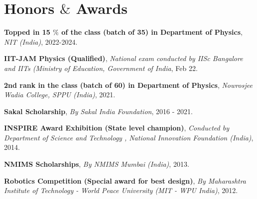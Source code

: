 \section{Honors $\&$ Awards}
    \begin{highlights}
         \item \textbf{Topped in 15 $\%$ of the class (batch of 35) in Department of Physics}, \textit{NIT (India)}, 2022-2024.
         \item \textbf{IIT-JAM Physics (Qualified)}, \textit{National exam conducted by IISc Bangalore and IITs (Ministry of Education, Government of India}, Feb 22.
         \item  \textbf{2nd rank in the class (batch of 60) in Department of Physics}, \textit{Nowrosjee Wadia College, SPPU (India)}, 2021.
         \item \textbf{Sakal Scholarship}, \textit{By Sakal India Foundation}, 2016 - 2021.
         \item \textbf{INSPIRE Award Exhibition (State level champion)}, \textit{Conducted by Department of Science and Technology , National Innovation Foundation (India)}, 2014.
         \item \textbf{NMIMS Scholarships}, \textit{By NMIMS Mumbai (India)}, 2013.
         \item \textbf{Robotics Competition (Special award for best design)}, \textit{By Maharashtra Institute of Technology - World Peace University (MIT - WPU India)}, 2012.
    \end{highlights}
    
